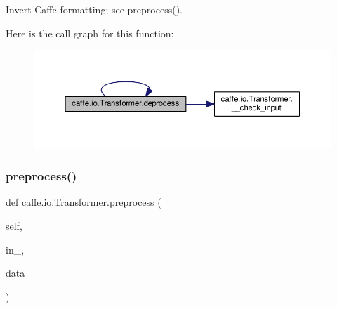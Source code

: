 \begin{DoxyVerb}Invert Caffe formatting; see preprocess().
\end{DoxyVerb}
 Here is the call graph for this function\+:
\nopagebreak
\begin{figure}[H]
\begin{center}
\leavevmode
\includegraphics[width=350pt]{classcaffe_1_1io_1_1_transformer_a3d048b7f8d255d29c04c2bcce0db318e_cgraph}
\end{center}
\end{figure}
\mbox{\label{classcaffe_1_1io_1_1_transformer_a0b2d73743d661b36853fe3d963bd5fbb}} 
\subsubsection{\texorpdfstring{preprocess()}{preprocess()}\hspace{0.1cm}{\footnotesize\ttfamily [1/2]}}
{\footnotesize\ttfamily def caffe.\+io.\+Transformer.\+preprocess (\begin{DoxyParamCaption}\item[{}]{self,  }\item[{}]{in\+\_\+,  }\item[{}]{data }\end{DoxyParamCaption})}

